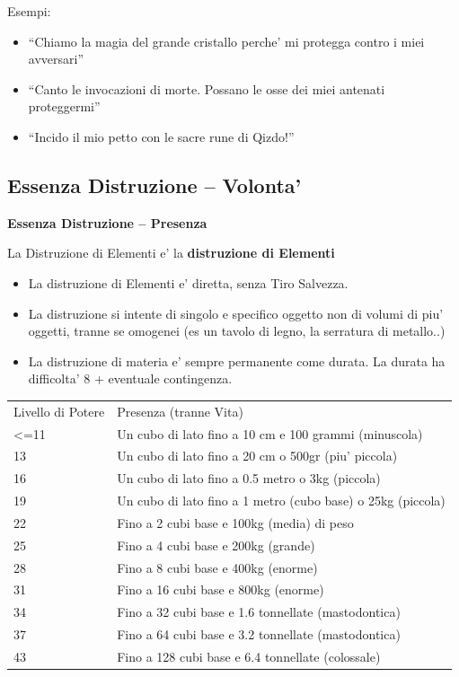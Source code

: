 \documentclass[a4paper,11pt,twoside,openany]{dndbook}
\begin{document}
\bigskip

Esempi:
\begin{itemize}
\item 
``Chiamo la magia del grande cristallo perche' mi protegga contro
i miei avversari'' 
\item 
``Canto le invocazioni di morte. Possano le osse dei miei antenati
proteggermi'' 
\item 
``Incido il mio petto con le sacre rune di Qizdo!'' 
\end{itemize}

\pagebreak

\subsection{Essenza Distruzione -- Volonta'}

\label{essenza-distruzione---volonta}

\textbf{Essenza Distruzione -- Presenza}

La Distruzione di Elementi e' la \textbf{distruzione di Elementi}
\begin{itemize}
\item 
La distruzione di Elementi e' diretta, senza Tiro Salvezza. 
\item 
La distruzione si intente di singolo e specifico oggetto non di volumi di piu' oggetti, tranne se omogenei (es un tavolo di legno, la serratura di metallo..) 
\item 
La distruzione di materia e' sempre permanente come durata. La durata ha difficolta' 8 + eventuale contingenza. 
\end{itemize}

\bigskip

\begin{tabular}[c]{@{}ll@{}}
\toprule 
Livello di Potere & Presenza (tranne Vita)\tabularnewline
\textless=11 & Un cubo di lato fino a 10 cm e 100 grammi (minuscola)\tabularnewline
13 & Un cubo di lato fino a 20 cm o 500gr (piu' piccola)\tabularnewline
16 & Un cubo di lato fino a 0.5 metro o 3kg (piccola)\tabularnewline
19 & Un cubo di lato fino a 1 metro (cubo base) o 25kg (piccola)\tabularnewline
22 & Fino a 2 cubi base e 100kg (media) di peso\tabularnewline
25 & Fino a 4 cubi base e 200kg (grande)\tabularnewline
28 & Fino a 8 cubi base e 400kg (enorme)\tabularnewline
31 & Fino a 16 cubi base e 800kg (enorme)\tabularnewline
34 & Fino a 32 cubi base e 1.6 tonnellate (mastodontica)\tabularnewline
37 & Fino a 64 cubi base e 3.2 tonnellate (mastodontica)\tabularnewline
43 & Fino a 128 cubi base e 6.4 tonnellate (colossale)\tabularnewline
\bottomrule
\end{tabular}
\end{document}
